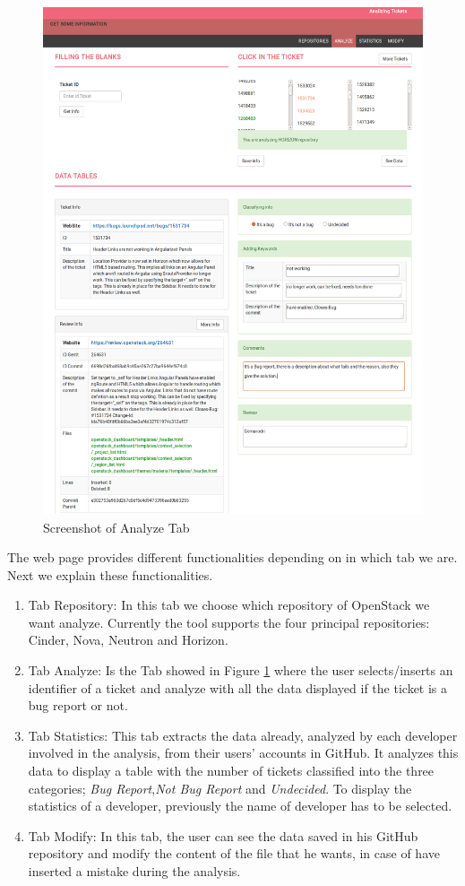 \documentclass[ifip]{svmult}
\begin{document}
\begin{figure}
\centering
\includegraphics[height=15cm]{index2.png}
\caption{Screenshot of Analyze Tab}
\label{fig:2}       %
\end{figure}

The web page provides different functionalities depending on in which tab we are. Next we explain these functionalities.
\begin{enumerate}
  \item Tab Repository: In this tab we choose which repository of OpenStack we want analyze. Currently the tool supports the four principal repositories: Cinder, Nova, Neutron and Horizon.
  \item Tab Analyze: Is the Tab showed in Figure \ref{fig:2} where the user selects/inserts an identifier of a ticket and analyze with all the data displayed if the ticket is a bug report or not.
  \item Tab Statistics: This tab extracts the data already, analyzed by each developer involved in the analysis, from their users' accounts in GitHub. It analyzes this data to display a table with the number of tickets classified into the three categories; \textit{Bug Report},\textit{Not Bug Report} and \textit{Undecided}. To display the statistics of a developer, previously the name of developer has to be selected.
  \item Tab Modify: In this tab, the user can see the data saved in his GitHub repository and modify the content of the file that he wants, in case of have inserted a mistake during the analysis.
\end{enumerate}
\end{document}

